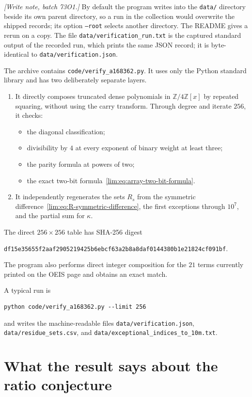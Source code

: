 \documentclass[11pt]{article}
\theoremstyle{definition}
\theoremstyle{remark}
\newcommand{\Zfour}{\mathbb Z/4\mathbb Z}
\begin{document}
\emph{[Write note, batch 73O1.]} By default the program writes into the
\texttt{data/} directory beside its own parent directory, so a run in the
collection would overwrite the shipped records; its option
\texttt{--root} selects another directory. The README gives a rerun on a
copy. The file \texttt{data/verification\_run.txt} is the captured
standard output of the recorded run, which prints the same JSON record;
it is byte-identical to \texttt{data/verification.json}.


The archive contains \texttt{code/verify\_a168362.py}.  It uses only the
Python standard library and has two deliberately separate layers.

\begin{enumerate}
\item It directly composes truncated dense polynomials in $\Zfour[x]$ by
repeated squaring, without using the carry transform.  Through degree and
iterate $256$, it checks:
  \begin{itemize}
  \item the diagonal classification;
  \item divisibility by $4$ at every exponent of binary weight at least three;
  \item the parity formula at powers of two;
  \item the exact two-bit formula~\eqref{lim:eq:array-two-bit-formula}.
  \end{itemize}
\item It independently regenerates the sets $R_s$ from the symmetric
  difference~\eqref{lim:eq:R-symmetric-difference}, the first exceptions through
  $10^7$, and the partial sum for $\kappa$.
\end{enumerate}

The direct $256\times256$ table has SHA-256 digest
\begin{center}
\texttt{df15e35655f2aaf2905219425b6ebcf63a2b8a8daf0144380b1e21824cf091bf}.
\end{center}
The program also performs direct integer composition for the $21$ terms
currently printed on the OEIS page and obtains an exact match.

A typical run is
\begin{lstlisting}
python code/verify_a168362.py --limit 256
\end{lstlisting}
and writes the machine-readable files
\texttt{data/verification.json}, \texttt{data/residue\_sets.csv}, and
\texttt{data/exceptional\_indices\_to\_10m.txt}.

\section{What the result says about the ratio conjecture}
\end{document}
